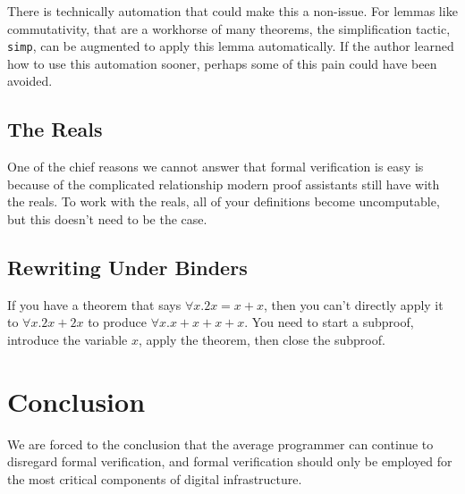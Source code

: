 \documentclass{article}
\begin{document}
There is technically automation that could make this a non-issue.
For lemmas like commutativity, that are a workhorse of many theorems, the simplification tactic, \texttt{simp}, can be augmented to apply this lemma automatically.
If the author learned how to use this automation sooner, perhaps some of this pain could have been avoided.

\subsection{The Reals}
One of the chief reasons we cannot answer that formal verification is easy is because of the complicated relationship modern proof assistants still have with the reals.
To work with the reals, all of your definitions become uncomputable, but this doesn't need to be the case.

\subsection{Rewriting Under Binders}
If you have a theorem that says $\forall x. 2x = x + x$, then you can't directly apply it to $\forall x. 2x + 2x$ to produce $\forall x. x + x + x + x$.
You need to start a subproof, introduce the variable $x$, apply the theorem, then close the subproof.

\section{Conclusion}
We are forced to the conclusion that the average programmer can continue to disregard formal verification, and formal verification should only be employed for the most critical components of digital infrastructure.



\end{document}
